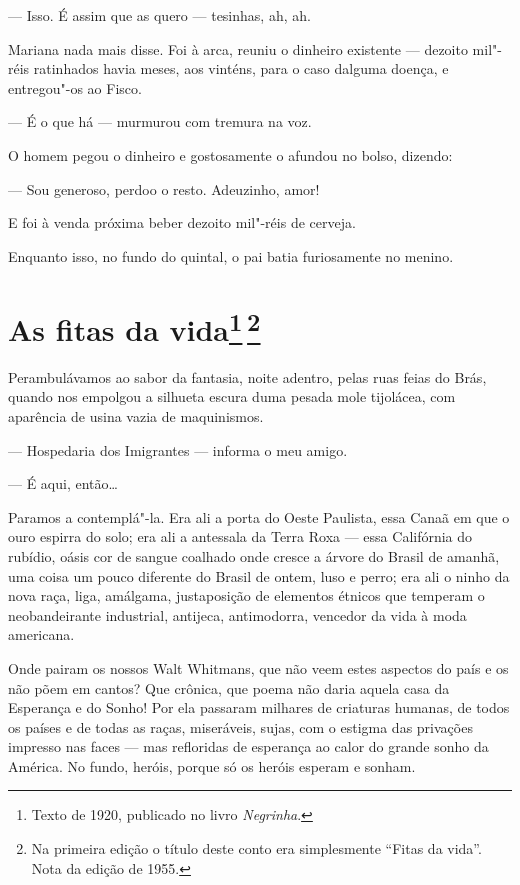 --- Isso. É assim que as quero --- tesinhas, ah, ah.

Mariana nada mais disse. Foi à arca, reuniu o dinheiro existente ---
dezoito mil"-réis ratinhados havia meses, aos vinténs, para o caso
dalguma doença, e entregou"-os ao Fisco.

--- É o que há --- murmurou com tremura na voz.

O homem pegou o dinheiro e gostosamente o afundou no bolso, dizendo:

--- Sou generoso, perdoo o resto. Adeuzinho, amor!

E foi à venda próxima beber dezoito mil"-réis de cerveja.

Enquanto isso, no fundo do quintal, o pai batia furiosamente no menino.

\chapter{As fitas da vida\footnote[*]{Texto de 1920, publicado no livro \emph{Negrinha}.}\,\footnote[**]{Na primeira   edição o título deste conto era simplesmente ``Fitas da vida''. Nota da edição de 1955.}}

Perambulávamos ao sabor da fantasia, noite adentro, pelas ruas feias do
Brás, quando nos empolgou a silhueta escura duma pesada mole tijolácea,
com aparência de usina vazia de maquinismos.

--- Hospedaria dos Imigrantes --- informa o meu amigo.

--- É aqui, então\ldots{}

Paramos a contemplá"-la. Era ali a porta do Oeste Paulista, essa Canaã em
que o ouro espirra do solo; era ali a antessala da Terra Roxa --- essa
Califórnia do rubídio, oásis cor de sangue coalhado onde cresce a árvore
do Brasil de amanhã, uma coisa um pouco diferente do Brasil de ontem,
luso e perro; era ali o ninho da nova raça, liga, amálgama, justaposição
de elementos étnicos que temperam o neobandeirante industrial, antijeca,
antimodorra, vencedor da vida à moda americana.

Onde pairam os nossos Walt Whitmans, que não veem estes aspectos do país
e os não põem em cantos? Que crônica, que poema não daria aquela casa da
Esperança e do Sonho! Por ela passaram milhares de criaturas humanas, de
todos os países e de todas as raças, miseráveis, sujas, com o estigma
das privações impresso nas faces --- mas refloridas de esperança ao
calor do grande sonho da América. No fundo, heróis, porque só os heróis
esperam e sonham.

